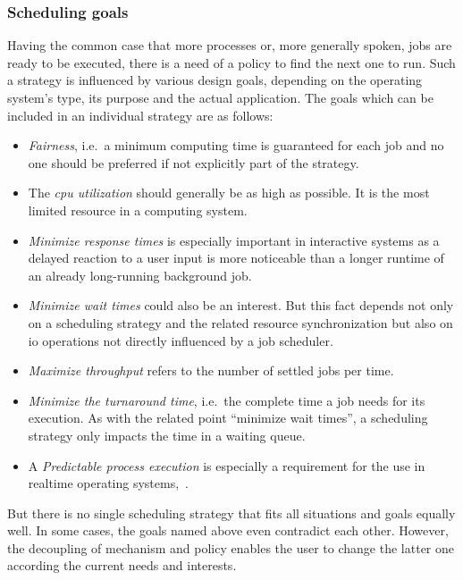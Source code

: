 \subsubsection*{Scheduling goals}
Having the common case that more processes or, more generally spoken, jobs are ready to be executed, there is a need of a policy to find the next one to run.
Such a strategy is influenced by various design goals, depending on the operating system's type, its purpose and the actual application\cite{mandl2014Grundkurs}.
The goals which can be included in an individual strategy are as follows:
\begin{itemize}
    \item \textit{Fairness}, i.e.\ a minimum computing time is guaranteed for each job and no one should be preferred if not explicitly part of the strategy.
    \item The \textit{\ac{cpu} utilization} should generally be as high as possible. It is the most limited resource in a computing system.
    \item \textit{Minimize response times} is especially important in interactive systems as a delayed reaction to a user input is more noticeable than a longer runtime of an already long-running background job.
    \item \textit{Minimize wait times} could also be an interest. But this fact depends not only on a scheduling strategy and the related resource synchronization but also on \ac{io} operations not directly influenced by a job scheduler. 
    \item \textit{Maximize throughput} refers to the number of settled jobs per time.
    \item \textit{Minimize the turnaround time}, i.e.\ the complete time a job needs for its execution. As with the related point ``minimize wait times'', a scheduling strategy only impacts the time in a waiting queue.
    \item A \textit{Predictable process execution} is especially a requirement for the use in realtime operating systems\cite{mandl2014Grundkurs},~\cite{brause2017betriebssysteme}. 
\end{itemize}
But there is no single scheduling strategy that fits all situations and goals equally well.
In some cases, the goals named above even contradict each other.
However, the decoupling of mechanism and policy enables the user to change the latter one according the current needs and interests\cite{brause2017betriebssysteme}.

